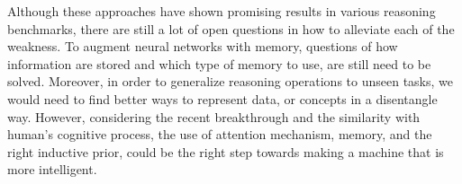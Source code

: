 \documentclass[journal]{IEEEtran}
\begin{document}
Although these approaches have shown promising results in various reasoning benchmarks, 
there are still a lot of open questions in how to alleviate each of the weakness. 
To augment neural networks with memory, questions of how information are stored 
and which type of memory to use, are still need to be solved. 
Moreover, in order to generalize reasoning operations to unseen tasks, 
we would need to find better ways to represent data, or concepts in a disentangle way.
However, considering the recent breakthrough and the similarity with human's cognitive process, 
the use of attention mechanism, memory, and the right inductive prior, could be the right step towards making a machine that is more intelligent.



\end{document}
